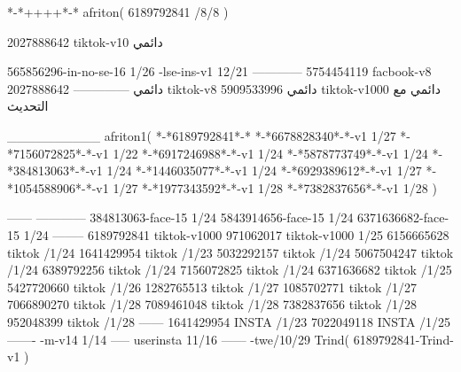 *-*++++*-*
afriton(
6189792841 /8/8
)

2027888642 tiktok-v10
دائمي

565856296-in-no-se-16 1/26
-lse-ins-v1 12/21
------------
5754454119 facbook-v8
دائمي
--------------
2027888642 tiktok-v8
دائمي
5909533996 tiktok-v1000
دائمي مع التحديث

__________
afriton1(
*-*6189792841*-*
*-*6678828340*-*-v1 1/27
*-*7156072825*-*-v1 1/22
*-*6917246988*-*-v1 1/24
*-*5878773749*-*-v1 1/24
*-*384813063*-*-v1 1/24
*-*1446035077*-*-v1 1/24
*-*6929389612*-*-v1 1/27
*-*1054588906*-*-v1 1/27
*-*1977343592*-*-v1 1/28
*-*7382837656*-*-v1 1/28
)

------
------------
384813063-face-15 1/24
5843914656-face-15 1/24
6371636682-face-15 1/24
--------
6189792841 tiktok-v1000
971062017 tiktok-v1000 1/25
6156665628 tiktok /1/24
1641429954 tiktok /1/23
5032292157 tiktok /1/24
5067504247 tiktok /1/24
6389792256 tiktok /1/24
7156072825 tiktok /1/24
6371636682 tiktok /1/25
5427720660 tiktok /1/26
1282765513 tiktok /1/27
1085702771 tiktok /1/27
7066890270 tiktok /1/28
7089461048 tiktok /1/28
7382837656 tiktok /1/28
952048399 tiktok /1/28
------
1641429954 INSTA /1/23
7022049118 INSTA /1/25
-------
-m-v14 1/14
-----
userinsta 11/16
------
-twe/10/29
Trind(
6189792841-Trind-v1 
)
